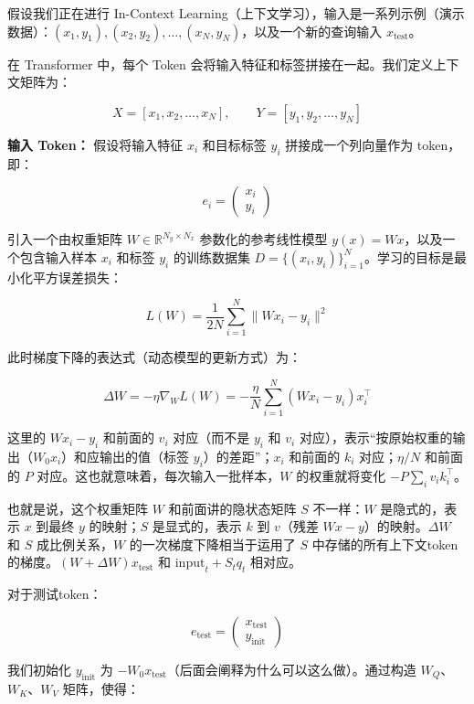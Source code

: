 假设我们正在进行 In-Context Learning（上下文学习），输入是一系列示例（演示数据）：\((x_1,y_1),(x_2,y_2),\ldots,(x_N,y_N)\)，以及一个新的查询输入 \(x_{\mathrm{test}}\)。

在 Transformer 中，每个 Token 会将输入特征和标签拼接在一起。我们定义上下文矩阵为：

\[
X=[x_1,x_2,\ldots,x_N],\qquad Y=[y_1,y_2,\ldots,y_N]
\]

\textbf{输入 Token：} 假设将输入特征 \(x_i\) 和目标标签 \(y_i\) 拼接成一个列向量作为 token，即：

\[
e_i=\begin{pmatrix}x_i\\y_i\end{pmatrix}
\]

引入一个由权重矩阵 \(W\in\mathbb{R}^{N_y\times N_x}\) 参数化的参考线性模型 \(y(x)=Wx\)，以及一个包含输入样本 \(x_i\) 和标签 \(y_i\) 的训练数据集 \(D=\{(x_i,y_i)\}_{i=1}^{N}\)。学习的目标是最小化平方误差损失：

\[
L(W)=\frac{1}{2N}\sum_{i=1}^{N}\|Wx_i-y_i\|^2
\]

此时梯度下降的表达式（动态模型的更新方式）为：

\[
\Delta W=-\eta\nabla_W L(W)=-\frac{\eta}{N}\sum_{i=1}^{N}(Wx_i-y_i)x_i^\top
\tag{3}
\]

这里的 \(Wx_i-y_i\) 和前面的 \(v_i\) 对应（而不是 \(y_i\) 和 \(v_i\) 对应），表示``按原始权重的输出（\(W_0x_i\)）和应输出的值（标签 \(y_i\)）的差距''；\(x_i\) 和前面的 \(k_i\) 对应；\(\eta/N\) 和前面的 \(P\) 对应。这也就意味着，每次输入一批样本，\(W\) 的权重就将变化 \(-P\sum_i v_i k_i^\top\)。

也就是说，这个权重矩阵 \(W\) 和前面讲的隐状态矩阵 \(S\) 不一样：\(W\) 是隐式的，表示 \(x\) 到最终 \(y\) 的映射；\(S\) 是显式的，表示 \(k\) 到 \(v\)（残差 \(Wx-y\)）的映射。\(\Delta W\) 和 \(S\) 成比例关系，\(W\) 的一次梯度下降相当于运用了 \(S\) 中存储的所有上下文token的梯度。\((W+\Delta W)x_{\mathrm{test}}\) 和 \(\mathrm{input}_t+S_tq_t\) 相对应。

对于测试token：

\[
e_{\mathrm{test}}=\begin{pmatrix}x_{\mathrm{test}}\\y_{\mathrm{init}}\end{pmatrix}
\]

我们初始化 \(y_{\mathrm{init}}\) 为 \(-W_0x_{\mathrm{test}}\)（后面会阐释为什么可以这么做）。通过构造 \(W_Q\)、\(W_K\)、\(W_V\) 矩阵，使得：

